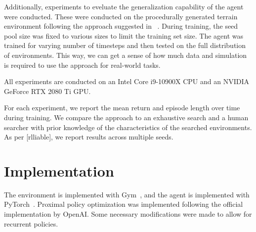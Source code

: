 Additionally, experiments to eveluate the generalization capability of the agent were conducted.
These were conducted on the procedurally generated terrain environment following the approach suggested in ~\cite{procgen}.
During training, the seed pool size was fixed to various sizes to limit the training set size.
The agent was trained for varying number of timesteps and then tested on the full distribution of environments.
This way, we can get a sense of how much data and simulation is required to use the approach for real-world tasks.

All experiments are conducted on an Intel Core i9-10900X CPU and an NVIDIA GeForce RTX 2080 Ti GPU.

For each experiment, we report the mean return and episode length over time during training.
We compare the approach to an exhaustive search and a human searcher with prior knowledge of the characteristics of the searched environments.
As per [rlliable], we report results across multiple seeds.


\section{Implementation}

The environment is implemented with Gym~\cite{gym}, and the agent is implemented with PyTorch~\cite{pytorch}.
Proximal policy optimization was implemented following the official implementation by OpenAI.
Some necessary modifications were made to allow for recurrent policies.










